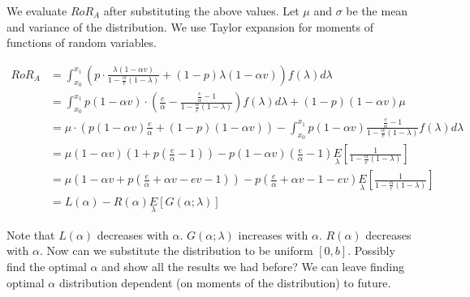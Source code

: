 \begin{comment}
Thus we have shown that for all $\theta$, $g(b,\theta) = 0$ as $b \to 0$ and that for all $\theta$ and $0 < b \leq 1$, $g(b,\theta)$ is decreasing. 
These together mean that for all $\theta$ and $b \in [0,1]$, $g(b,\theta) \leq 0$. 
Which implies that $f'(\theta) \le 0$ for all $\theta$ in the domain.
So to maximize $f$, we need to minimize $\theta$.

Observe that minimizing $\theta = \frac{k}{\Delta}$ is equivalent to minimizing the influence zone.
As shown in Remark~\ref{rem:inf_zone}, this happens at $k = \frac{e}{\alpha(1-\beta)}$. 
\endproof

\end{comment}

We evaluate $RoR_A$ after substituting the above values.
Let $\mu$ and $\sigma$ be the mean and variance of the distribution.
We use Taylor expansion for moments of functions of random variables.

\begin{align*}
RoR_A &= \int_{x_0}^{x_1} \left(p\cdot\frac{\lambda(1-\alpha v)}{1-\frac{\alpha}{e}(1-\lambda)} + (1-p)\lambda (1-\alpha v)\right) f(\lambda) d\lambda\\
      &= \int_{x_0}^{x_1} p(1-\alpha v)\cdot\left(\frac{e}{\alpha} - \frac{\frac{e}{\alpha }-1}{1-\frac{\alpha}{e}(1-\lambda)}\right)f(\lambda) d\lambda + (1-p)(1-\alpha v) \mu\\
      &= \mu \cdot \left(p(1-\alpha v)\frac{e}{\alpha} + (1-p)(1-\alpha v)\right) - \int_{x_0}^{x_1} p(1-\alpha v) \frac{\frac{e}{\alpha} - 1}{1-\frac{\alpha}{e} (1-\lambda)} f(\lambda) d\lambda\\
      &= \mu (1-\alpha v) \left( 1 + p(\frac{e}{\alpha}-1)\right) - p(1-\alpha v)\left(\frac{e}{\alpha} -1\right) \underset{\lambda}E\left[\frac{1}{1-\frac{\alpha}{e}(1-\lambda)}\right]\\
      &= \mu \left(1-\alpha v + p\left(\frac{e}{\alpha} + \alpha v - ev - 1\right)\right) - p \left(\frac{e}{\alpha} + \alpha v - 1 - ev\right) \underset{\lambda} E\left[\frac{1}{1-\frac{\alpha}{e}(1-\lambda)}\right] \\
      &= L(\alpha) - R(\alpha) \underset{\lambda} E[G(\alpha; \lambda)]
\end{align*}

Note that $L(\alpha)$ decreases with $\alpha$.
$G(\alpha; \lambda)$ increases with $\alpha$.
$R(\alpha)$ decreases with $\alpha$.
{\arpit Now can we substitute the distribution to be uniform $[0,b]$. Possibly find the optimal $\alpha$ and show all the results we had before? We can leave finding optimal $\alpha$ distribution dependent (on moments of the distribution) to future.}

